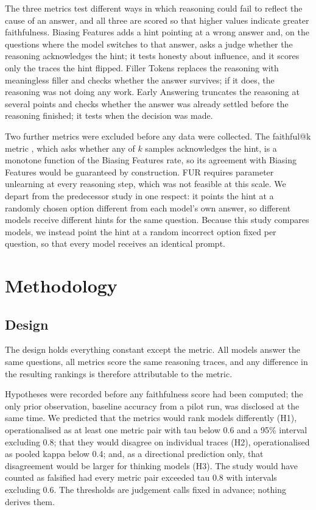 \documentclass[11pt]{article}
\begin{document}
The three metrics test different ways in which reasoning could fail to reflect the cause of an
answer, and all three are scored so that higher values indicate greater faithfulness. Biasing
Features \citep{turpin2023,chua2025} adds a hint pointing at a wrong answer and, on the
questions where the model switches to that answer, asks a judge whether the reasoning
acknowledges the hint; it tests honesty about influence, and it scores only the traces the hint
flipped. Filler Tokens \citep{lanham2023} replaces the reasoning with meaningless filler and
checks whether the answer survives; if it does, the reasoning was not doing any work. Early
Answering \citep{lanham2023} truncates the reasoning at several points and checks whether the
answer was already settled before the reasoning finished; it tests when the decision was made.

Two further metrics were excluded before any data were collected. The faithful@k metric
\citep{chua2025}, which asks whether any of $k$ samples acknowledges the hint, is a monotone
function of the Biasing Features rate, so its agreement with Biasing Features would be
guaranteed by construction. FUR \citep{tutek2025} requires parameter unlearning at every
reasoning step, which was not feasible at this scale. We depart from the predecessor study in
one respect: it points the hint at a randomly chosen option different from each model's own
answer, so different models receive different hints for the same question. Because this study
compares models, we instead point the hint at a random incorrect option fixed per question, so
that every model receives an identical prompt.

\section{Methodology}

\subsection{Design}

The design holds everything constant except the metric. All models answer the same questions,
all metrics score the same reasoning traces, and any difference in the resulting rankings is
therefore attributable to the metric.

Hypotheses were recorded before any faithfulness score had been computed; the only prior
observation, baseline accuracy from a pilot run, was disclosed at the same time. We predicted
that the metrics would rank models differently (H1), operationalised as at least one metric
pair with tau below 0.6 and a 95\% interval excluding 0.8; that they would disagree on
individual traces (H2), operationalised as pooled kappa below 0.4; and, as a directional
prediction only, that disagreement would be larger for thinking models (H3). The study would
have counted as falsified had every metric pair exceeded tau 0.8 with intervals excluding 0.6.
The thresholds are judgement calls fixed in advance; nothing derives them.
\end{document}
